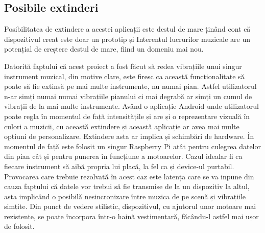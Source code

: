 \documentclass[../IoMusT.tex]{subfiles}
\begin{document}
\subsection{Posibile extinderi}
Posibilitatea de extindere a acestei aplicații este destul de mare ținând cont că dispozitivul creat este doar un prototip și Interentul lucrurilor muzicale are un potențial de creștere destul de mare, fiind un domeniu mai nou.
\\
\par Datorită faptului că acest proiect a fost făcut să redea vibrațiile unui singur instrument muzical, din motive clare, este firesc ca această funcționalitate să poate să fie extinsă pe mai multe instrumente, nu numai pian. Astfel utilizatorul n-ar simți numai numai vibrațiile pianului ci mai degrabă ar simți un cumul de vibrații de la mai multe instrumente. Având o aplicație Android unde utilizatorul poate regla în momentul de față intensitățile și are și o reprezentare vizuală în culori a muzicii, cu această extindere și această aplicație ar avea mai multe opțiuni de personalizare. Extindere asta ar implica și schimbări de hardware. În momentul de față este folosit un singur Raspberry Pi atât pentru culegrea datelor din pian cât și pentru punerea în funcțiune a motoarelor. Cazul idealar fi ca fiecare instrument să aibă propria lui placă, la fel ca și device-ul purtabil. Provocarea care trebuie rezolvată în acest caz este latența care se va inpune din cauza faptului că datele vor trebui să fie transmise de la un dispozitiv la altul, asta implicând o posibilă nesincronizare între muzica de pe scenă și vibrațiile simțite. Din punct de vedere stilistic, dispozitivul, cu ajutorul unor motoare mai rezistente, se poate încorpora într-o haină vestimentară, făcându-l astfel mai ușor de folosit.
\end{document}
